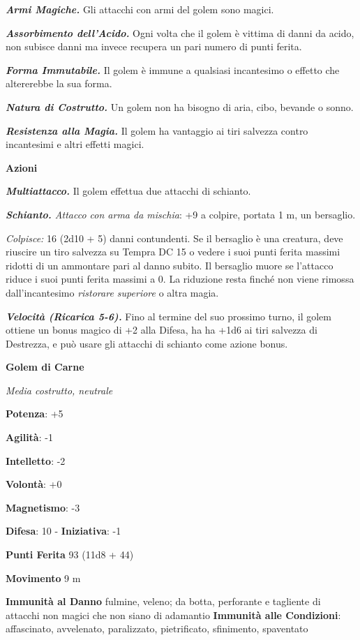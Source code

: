 \begin{multicols}{2}
\emph{\textbf{Armi Magiche.}} Gli attacchi con armi del golem sono
magici.

\emph{\textbf{Assorbimento dell'Acido.}} Ogni volta che il golem è
vittima di danni da acido, non subisce danni ma invece recupera un pari
numero di punti ferita.

\emph{\textbf{Forma Immutabile.}} Il golem è immune a qualsiasi
incantesimo o effetto che altererebbe la sua forma.

\emph{\textbf{Natura di Costrutto.}} Un golem non ha bisogno di aria,
cibo, bevande o sonno.

\emph{\textbf{Resistenza alla Magia.}} Il golem ha vantaggio ai tiri
salvezza contro incantesimi e altri effetti magici.

\smallskip\textbf{Azioni}

\emph{\textbf{Multiattacco.}} Il golem effettua due attacchi di
schianto.

\emph{\textbf{Schianto.} Attacco con arma da mischia}: +9 a colpire,
portata 1 m, un bersaglio.

\emph{Colpisce:} 16 (2d10 + 5) danni contundenti. Se il bersaglio è una
creatura, deve riuscire un tiro salvezza su Tempra DC 15 o vedere
i suoi punti ferita massimi ridotti di un ammontare pari al danno
subito. Il bersaglio muore se l'attacco riduce i suoi punti ferita
massimi a 0. La riduzione resta finché non viene rimossa
dall'incantesimo \emph{ristorare superiore} o altra magia.

\emph{\textbf{Velocità (Ricarica 5-6).}} Fino al termine del suo
prossimo turno, il golem ottiene un bonus magico di +2 alla Difesa, ha
ha +1d6 ai tiri salvezza di Destrezza, e può usare gli attacchi di
schianto come azione bonus.

\textbf{Golem di Carne}

\emph{Media costrutto, neutrale}

\textbf{Potenza}: +5

\textbf{Agilità}: -1

\textbf{Intelletto}: -2

\textbf{Volontà}: +0

\textbf{Magnetismo}: -3

\textbf{Difesa}: 10 - \textbf{Iniziativa}: -1

\textbf{Punti Ferita} 93 (11d8 + 44)

\textbf{Movimento} 9 m

\textbf{Immunità al Danno} fulmine, veleno; da botta, perforante e
tagliente di attacchi non magici che non siano di adamantio
\textbf{Immunità alle Condizioni}: affascinato, avvelenato, paralizzato,
pietrificato, sfinimento, spaventato


\end{multicols}
